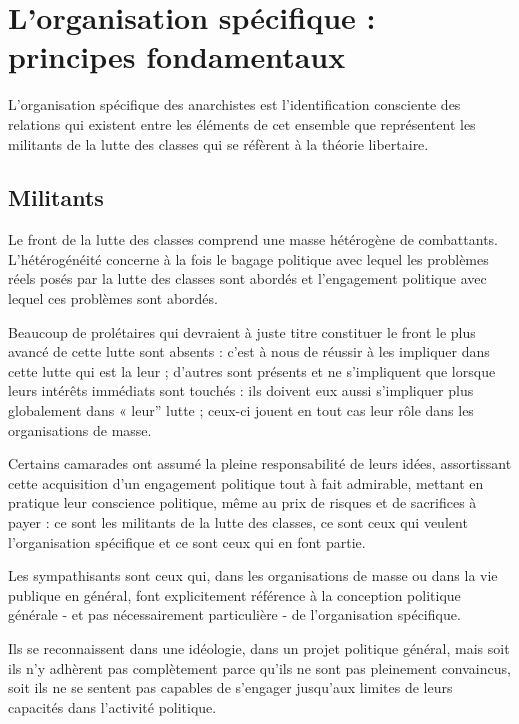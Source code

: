 \chapter{L'organisation spécifique : principes fondamentaux}\hypertarget{lorganisation-spcifique--principes-fondamentaux}{}\label{lorganisation-spcifique--principes-fondamentaux}

L'organisation spécifique des anarchistes est l'identification consciente des relations qui existent entre les éléments de cet ensemble que représentent les militants de la lutte des classes qui se réfèrent à la théorie libertaire.

\section{Militants}\hypertarget{militants}{}\label{militants}

Le front de la lutte des classes comprend une masse hétérogène de combattants. L'hétérogénéité concerne à la fois le bagage politique avec lequel les problèmes réels posés par la lutte des classes sont abordés et l'engagement politique avec lequel ces problèmes sont abordés.

Beaucoup de prolétaires qui devraient à juste titre constituer le front le plus avancé de cette lutte sont absents : c'est à nous de réussir à les impliquer dans cette lutte qui est la leur ; d'autres sont présents et ne s'impliquent que lorsque leurs intérêts immédiats sont touchés : ils doivent eux aussi s'impliquer plus globalement dans « leur'' lutte ; ceux-ci jouent en tout cas leur rôle dans les organisations de masse.

Certains camarades ont assumé la pleine responsabilité de leurs idées, assortissant cette acquisition d'un engagement politique tout à fait admirable, mettant en pratique leur conscience politique, même au prix de risques et de sacrifices à payer : ce sont les militants de la lutte des classes, ce sont ceux qui veulent l'organisation spécifique et ce sont ceux qui en font partie.

Les sympathisants sont ceux qui, dans les organisations de masse ou dans la vie publique en général, font explicitement référence à la conception politique générale - et pas nécessairement particulière - de l'organisation spécifique.

Ils se reconnaissent dans une idéologie, dans un projet politique général, mais soit ils n'y adhèrent pas complètement parce qu'ils ne sont pas pleinement convaincus, soit ils ne se sentent pas capables de s'engager jusqu'aux limites de leurs capacités dans l'activité politique.

